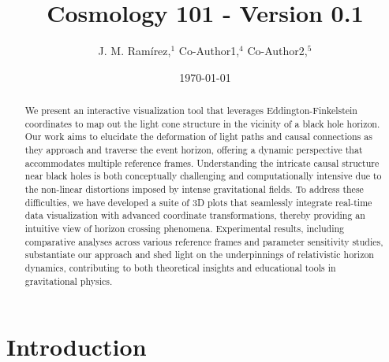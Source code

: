\documentclass{article}
\title{Cosmology 101 - Version 0.1}
\author{J. M. Ram{\'i}rez,$^{1}$ Co-Author1,$^{4}$ Co-Author2,$^{5}$}
\date{\today}
\begin{document}
\maketitle \begin{abstract}
We present an interactive visualization tool that leverages Eddington-Finkelstein coordinates to map out the light cone structure in the vicinity of a black hole horizon. Our work aims to elucidate the deformation of light paths and causal connections as they approach and traverse the event horizon, offering a dynamic perspective that accommodates multiple reference frames. Understanding the intricate causal structure near black holes is both conceptually challenging and computationally intensive due to the non-linear distortions imposed by intense gravitational fields. To address these difficulties, we have developed a suite of 3D plots that seamlessly integrate real-time data visualization with advanced coordinate transformations, thereby providing an intuitive view of horizon crossing phenomena. Experimental results, including comparative analyses across various reference frames and parameter sensitivity studies, substantiate our approach and shed light on the underpinnings of relativistic horizon dynamics, contributing to both theoretical insights and educational tools in gravitational physics.\end{abstract}\section{Introduction}
\end{document}
